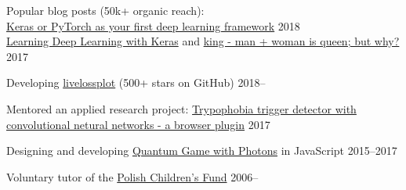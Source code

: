 \documentclass[margin,line]{resume}
\begin{document}
\begin{resume}
    \begin{list2}
      \item Popular blog posts (50k+ organic reach):\\
      \href{https://deepsense.ai/keras-or-pytorch/}{Keras or PyTorch as your first deep learning framework} \hfill {2018}\\
      \href{http://p.migdal.pl/2017/04/30/teaching-deep-learning.html}{Learning Deep Learning with Keras} and \href{http://p.migdal.pl/2017/01/06/king-man-woman-queen-why.html}{king - man + woman is queen; but why?} \hfill {2017}
        \item Developing \href{https://github.com/stared/livelossplot}{livelossplot} (500+ stars on GitHub) \hfill 2018--
        \item Mentored an applied research project: \href{https://github.com/cytadela8/trypophobia}{Trypophobia trigger detector with convolutional netural networks - a browser plugin} \hfill 2017
        \item Designing and developing \href{http://quantumgame.io/}{Quantum Game with Photons} in JavaScript \hfill {2015--2017}
        \item Voluntary tutor of the \href{http://crastina.se/gifted-children-in-poland-by-piotr-migdal/}{Polish Children's Fund} \hfill { 2006--}
    \end{list2}



\end{resume}
\end{document}
